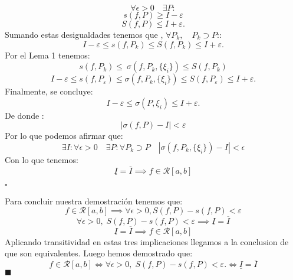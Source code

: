 \documentclass[10pt]{article}
\begin{document}
\begin{equation}
	\forall \epsilon > 0  \quad\exists P: 
\end{equation}
\begin{equation}
    s(f, P) \geq I - \varepsilon
\end{equation}
\begin{equation}
    S(f, P) \leq  I + \varepsilon.
\end{equation}
Sumando estas desigualdades tenemos que  , $\forall P_k, \quad P_k \supset P$::
\begin{equation}
    I - \varepsilon \leq s(f,P_k) \leq S(f, P_k) \leq I + \varepsilon.
\end{equation}
Por el Lema 1 tenemos:
\begin{equation}
  s(f,P_k)  \leq \ \sigma (f,P_k,\{\xi_i\})  \leq S(f, P_k) 
\end{equation}
\begin{equation}
    I - \varepsilon \leq s(f, P_\varepsilon)  \leq \sigma (f,P_k,\{\xi_i\}) \leq S(f, P_\varepsilon) \leq I + \varepsilon.
\end{equation}
Finalmente, se concluye:
\begin{equation}
    I - \varepsilon\leq \sigma(P, \xi_i) \leq  I + \varepsilon.
\end{equation}
De donde :
\begin{equation}
    |\sigma(f, P) - I| < \varepsilon
\end{equation}
 Por lo que podemos afirmar que:
 	\begin{equation}
 	    \exists I:\forall\epsilon >0 \quad\exists P: \forall P_k \supset P \quad|\sigma (f,P_k,\{\xi_i\}) - I| < \epsilon
 	\end{equation}
Con lo que tenemos:
\begin{equation}
\underline{I} =\overline{I}\implies
   f \in \mathcal{R}[a, b] 
\end{equation}

            \begin{flushright}
				$\square$
			\end{flushright}

 Para concluir nuestra demostración tenemos que:
 \begin{equation}
     f \in \mathcal{R}[a, b] \implies \forall \epsilon > 0,  S(f,P)-s(f,P) < \varepsilon
\end{equation}
\begin{equation}
\forall \epsilon > 0,\;  S(f,P)-s(f,P) < \varepsilon \implies \underline{I} =\overline{I}
\end{equation}\begin{equation}
\underline{I} =\overline{I}\implies
   f \in \mathcal{R}[a, b] 
\end{equation}
Aplicando transitividad en estas tres implicaciones llegamos a la conclusion de que son equivalentes. Luego hemos demostrado que:
\begin{equation}
 f \in \mathcal{R}[a, b] \iff \forall \epsilon > 0,\;  S(f,P)-s(f,P) < \varepsilon. \iff\underline{I} =\overline{I}
\end{equation}
 \hfill \(\blacksquare\)
\end{document}
